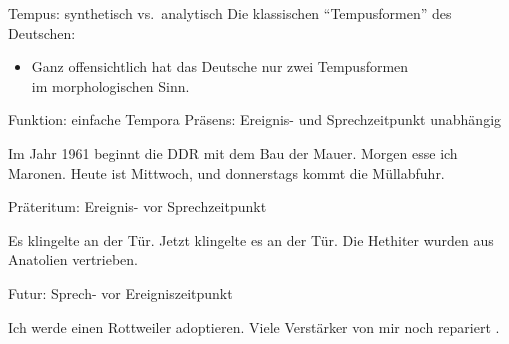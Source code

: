 \begin{frame}
  {Tempus: synthetisch vs.\ analytisch}
  \pause
  Die klassischen "`Tempusformen"' des Deutschen:\\
  \Halbzeile
  \pause
  \begin{center}
  \end{center}
  \pause
  \Halbzeile
  \begin{itemize}[<+->]
    \item \alert{Ganz offensichtlich hat das Deutsche nur zwei Tempusformen\\
      im morphologischen Sinn.}
  \end{itemize} 
\end{frame}

\begin{frame}
  {Funktion: einfache Tempora}
  \pause
  \alert{Präsens: Ereignis- und Sprechzeitpunkt unabhängig}
  \pause
  \begin{exe}\ex\begin{xlist}
      \ex Im Jahr 1961 \alert{beginnt} die DDR mit dem Bau der Mauer.
      \pause
      \ex Morgen \alert{esse} ich Maronen.
      \pause
      \ex Heute \alert{ist} Mittwoch, und donnerstags \alert{kommt} die Müllabfuhr.
  \end{xlist}\end{exe}
  \pause
  \Halbzeile
  \alert{Präteritum: Ereignis- vor Sprechzeitpunkt}
  \pause
  \begin{exe}\ex\begin{xlist}
      \ex Es \alert{klingelte} an der Tür.
      \pause
    \ex Jetzt \alert{klingelte} es an der Tür.
      \pause
    \ex Die Hethiter \alert{wurden} aus Anatolien vertrieben.
  \end{xlist}\end{exe}
  \pause
  \Halbzeile
  \alert{Futur: Sprech- vor Ereigniszeitpunkt}
  \pause
  \begin{exe}\ex\begin{xlist}
      \ex Ich \alert{werde} einen Rottweiler \alert{adoptieren}.
      \pause
      \ex Viele Verstärker  von mir noch \alert{repariert} .
  \end{xlist}\end{exe}
\end{frame}

